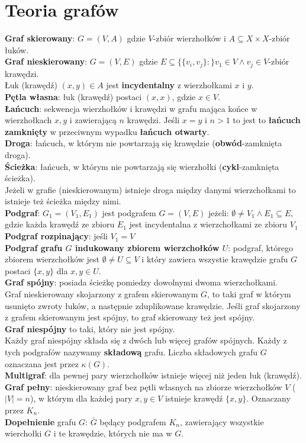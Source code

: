 \documentclass[a4paper,12pt]{article}
\begin{document}
\section{Teoria grafów}
\textbf{Graf skierowany}: $G=(V,A)$ gdzie $V$-zbiór wierzhołków i $A\subseteq X\times X$-zbiór łuków.\\
\textbf{Graf nieskierowany}: $G=(V,E)$ gdzie $E\subseteq \{\{v_i,v_j\}:\}v_1\in V \wedge v_j\in V$-zbiór krawędzi.\\
Łuk (krawędź) $(x,y)\in A$ jest \textbf{incydentalny} z wierzhołkami $x$ i $y$.\\
\textbf{Pętla własna}: łuk (krawędź) postaci $(x,x)$, gdzie $x\in V$. \\
\textbf{Łańcuch}: sekwencja wierzhołków i krawędzi w grafu mająca końce w wierzhołkach $x, y$ i zawierającą $n$ krawędzi. Jeśli $x=y$ i $n>1$ to jest to \textbf{łańcuch zamknięty} w przeciwnym wypadku \textbf{łańcuch otwarty}.\\
\textbf{Droga}: łańcuch, w którym nie powtarzają się krawędzie (\textbf{obwód}-zamknięta droga).\\
\textbf{Ścieżka}: łańcuch, w którym nie powtarzają się wierzhołki (\textbf{cykl}-zamknięta ścieżka).\\
Jeżeli w grafie (nieskierowanym) istnieje droga między danymi wierzchołkami to istnieje też ścieżka między nimi.\\
\textbf{Podgraf}: $G_1=(V_1,E_1)$ jest podgrafem $G=(V,E)$ jeżeli: $\emptyset \neq V_1 \wedge E_1 \subseteq E$, gdzie każda krawędź ze zbioru $E_1$ jest incydentalna z wierzchołkami ze zbioru $V_1$\\
\textbf{Podgraf rozpinający}: jeśli $V_1=V$ \\
\textbf{Podgraf grafu $G$ indukowany zbiorem wierzchołków $U$}: podgraf, którego zbiorem wierzchołków jest $\emptyset\neq U\subseteq V$ i który zawiera wszystie krawędzie grafu $G$ postaci $\{x,y\}$ dla $x,y \in U$. \\
\textbf{Graf spójny}: posiada ścieżkę pomiedzy dowolnymi dwoma wierzchołkami.\\
Graf nieskierowany skojarzony z grafem skierowanym $G$, to taki graf w którym usunięto zwroty łuków, a następnie zduplikowane krawędzie. Jeśli graf skojarzony z grafem skierowanym jest spójny, to graf skierowany też jest spójny. \\
\textbf{Graf niespójny} to taki, który nie jest spójny.\\
Każdy graf niespójny składa się z dwóch lub więcej grafów spójnych. Każdy z tych podgrafów nazywamy \textbf{składową} grafu. Liczba składowych grafu $G$ oznaczana jest przez $\kappa(G)$. \\
\textbf{Multigraf}: dla pewnej pary wierzchołków istnieje więcej niż jeden łuk (krawędź).\\
\textbf{Graf pełny}: nieskierowany graf bez pętli własnych na zbiorze wierzchołków $V$ ($|V|=n$), w którym dla każdej pary $x,y\in V$ istnieje krawędź $\{x,y\}$. Oznaczany przez $K_n$.\\
\textbf{Dopełnienie} grafu $G$: $\bar G$ będący podgrafem $K_n$, zawierający wszystkie wierchołki $G$ i te krawędzie, których nie ma w $G$.
\end{document}

